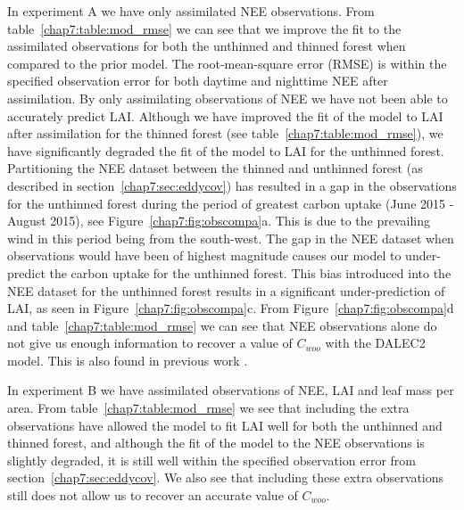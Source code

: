 In experiment A we have only assimilated NEE observations. From table~\ref{chap7:table:mod_rmse} we can see that we improve the fit to the assimilated observations for both the unthinned and thinned forest when compared to the prior model. The root-mean-square error (RMSE) is within the specified observation error for both daytime and nighttime NEE after assimilation. By only assimilating observations of NEE we have not been able to accurately predict LAI. Although we have improved the fit of the model to LAI after assimilation for the thinned forest (see table~\ref{chap7:table:mod_rmse}), we have significantly degraded the fit of the model to LAI for the unthinned forest. Partitioning the NEE dataset between the thinned and unthinned forest (as described in section~\ref{chap7:sec:eddycov}) has resulted in a gap in the observations for the unthinned forest during the period of greatest carbon uptake (June 2015 - August 2015), see Figure~\ref{chap7:fig:obscompa}a. This is due to the prevailing wind in this period being from the south-west. The gap in the NEE dataset when observations would have been of highest magnitude causes our model to under-predict the carbon uptake for the unthinned forest. This bias introduced into the NEE dataset for the unthinned forest results in a significant under-prediction of LAI, as seen in Figure~\ref{chap7:fig:obscompa}c. From Figure~\ref{chap7:fig:obscompa}d and table~\ref{chap7:table:mod_rmse} we can see that NEE observations alone do not give us enough information to recover a value of \(C_{woo}\) with the DALEC2 model. This is also found in previous work \citep{fox2009reflex}.

In experiment B we have assimilated observations of NEE, LAI and leaf mass per area. From table~\ref{chap7:table:mod_rmse} we see that including the extra observations have allowed the model to fit LAI well for both the unthinned and thinned forest, and although the fit of the model to the NEE observations is slightly degraded, it is still well within the specified observation error from section~\ref{chap7:sec:eddycov}. We also see that including these extra observations still does not allow us to recover an accurate value of \(C_{woo}\).      

